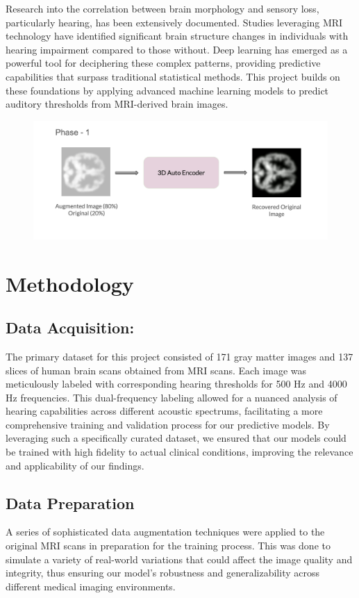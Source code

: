 \documentclass[conference,compsoc]{IEEEtran}
\begin{document}
Research into the correlation between brain morphology and sensory loss, particularly hearing, has been extensively documented. Studies leveraging MRI technology have identified significant brain structure changes in individuals with hearing impairment compared to those without. Deep learning has emerged as a powerful tool for deciphering these complex patterns, providing predictive capabilities that surpass traditional statistical methods. This project builds on these foundations by applying advanced machine learning models to predict auditory thresholds from MRI-derived brain images.

\begin{figure}[htbp]
    \centering
    \includegraphics[width=\textwidth]{Phase1.jpeg}  %
    \caption{}
    \label{phase1}
\end{figure}

\section{Methodology}

\subsection{Data Acquisition:} The primary dataset for this project consisted of 171 gray matter images and 137 slices of human brain scans obtained from MRI scans. Each image was meticulously labeled with corresponding hearing thresholds for 500 Hz and 4000 Hz frequencies. This dual-frequency labeling allowed for a nuanced analysis of hearing capabilities across different acoustic spectrums, facilitating a more comprehensive training and validation process for our predictive models. By leveraging such a specifically curated dataset, we ensured that our models could be trained with high fidelity to actual clinical conditions, improving the relevance and applicability of our findings.

\subsection{Data Preparation} A series of sophisticated data augmentation techniques were applied to the original MRI scans in preparation for the training process. This was done to simulate a variety of real-world variations that could affect the image quality and integrity, thus ensuring our model's robustness and generalizability across different medical imaging environments.
\end{document}
